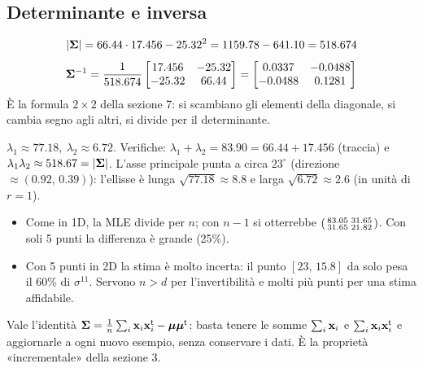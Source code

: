 \subsection{Determinante e inversa}
\begin{esempio}
\[
|\bm{\Sigma}|=66.44\cdot17.456-25.32^2=1159.78-641.10=518.674
\]
\[
\bm{\Sigma}^{-1}=\frac{1}{518.674}\begin{bmatrix}17.456&-25.32\\-25.32&66.44\end{bmatrix}=\begin{bmatrix}0.0337&-0.0488\\-0.0488&0.1281\end{bmatrix}
\]
È la formula $2\times2$ della sezione 7: si scambiano gli elementi della diagonale, si cambia segno agli altri, si divide per il determinante.
\end{esempio}
\begin{tecnica}
$\lambda_1\approx77.18,\ \lambda_2\approx6.72$. Verifiche: $\lambda_1+\lambda_2=83.90=66.44+17.456$ (traccia) e $\lambda_1\lambda_2\approx518.67=|\bm{\Sigma}|$. L'asse principale punta a circa $23^\circ$ (direzione $\approx(0.92,\,0.39)$): l'ellisse è lunga $\sqrt{77.18}\approx8.8$ e larga $\sqrt{6.72}\approx2.6$ (in unità di $r=1$).
\end{tecnica}


\begin{attenzione}
\begin{itemize}
  \item Come in 1D, la MLE divide per $n$; con $n-1$ si otterrebbe $\begin{psmallmatrix}83.05&31.65\\31.65&21.82\end{psmallmatrix}$. Con soli 5 punti la differenza è grande (25\%).
  \item Con 5 punti in 2D la stima è molto incerta: il punto $[23,\,15.8]$ da solo pesa il 60\% di $\sigma^{11}$. Servono $n>d$ per l'invertibilità e molti più punti per una stima affidabile.
\end{itemize}
\end{attenzione}
\begin{mlbox}
Vale l'identità $\bm{\Sigma}=\frac1n\sum_i\mathbf{x}_i\mathbf{x}_i^{\mathsf{t}}-\bm{\mu}\bm{\mu}^{\mathsf{t}}$: basta tenere le somme $\sum_i\mathbf{x}_i$ e $\sum_i\mathbf{x}_i\mathbf{x}_i^{\mathsf{t}}$ e aggiornarle a ogni nuovo esempio, senza conservare i dati. È la proprietà «incrementale» della sezione 3.
\end{mlbox}

